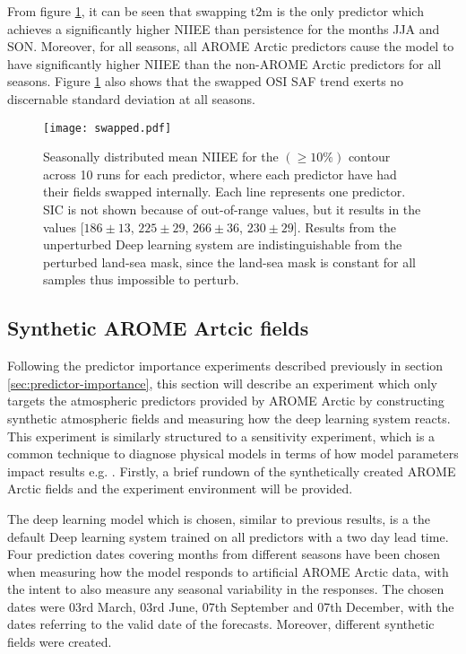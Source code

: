 \documentclass[../main/thesis.tex]{subfiles}
\begin{document}
From figure \ref{fig:swapped}, it can be seen that swapping t2m is the only predictor which achieves a significantly higher NIIEE than persistence for the months JJA and SON. Moreover, for all seasons, all AROME Arctic predictors cause the model to have significantly higher NIIEE than the non-AROME Arctic predictors for all seasons. Figure \ref{fig:swapped} also shows that the swapped OSI SAF trend exerts no discernable standard deviation at all seasons.


\begin{figure}
    \centering
    \texttt{[image: swapped.pdf]}
    \caption{\label{fig:swapped}Seasonally distributed mean NIIEE for the $(\geq10\%)$ contour across 10 runs for each predictor, where each predictor have had their fields swapped internally. Each line represents one predictor. SIC is not shown because of out-of-range values, but it results in the values [$186 \pm 13$, $225 \pm 29$, $266 \pm 36$, $230 \pm 29$]. Results from the unperturbed Deep learning system are indistinguishable from the perturbed land-sea mask, since the land-sea mask is constant for all samples thus impossible to perturb.}
\end{figure}

\subsection{Synthetic AROME Artcic fields}
\label{sec:synthetic_preds}
Following the predictor importance experiments described previously in section \ref{sec:predictor-importance}, this section will describe an experiment which only targets the atmospheric predictors provided by AROME Arctic by constructing synthetic atmospheric fields and measuring how the deep learning system reacts. This experiment is similarly structured to a sensitivity experiment, which is a common technique to diagnose physical models in terms of how model parameters impact results e.g. \citep{Kim2006}. Firstly, a brief rundown of the synthetically created AROME Arctic fields and the experiment environment will be provided.

The deep learning model which is chosen, similar to previous results, is a the default Deep learning system trained on all predictors with a two day lead time. Four prediction dates covering months from different seasons have been chosen when measuring how the model responds to artificial AROME Arctic data, with the intent to also measure any seasonal variability in the responses. The chosen dates were 03rd March, 03rd June, 07th September and 07th December, with the dates referring to the valid date of the forecasts. Moreover, different synthetic fields were created.
\end{document}
